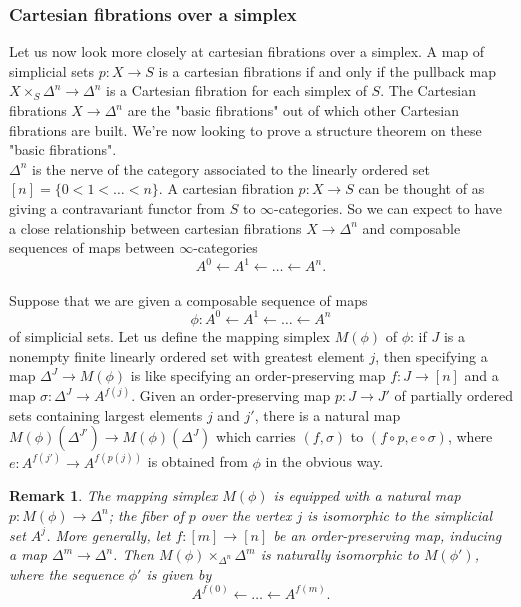 \documentclass[12pt]{amsart}
\newcommand{\8}{\ensuremath{\infty}}
\newtheorem{remark}{Remark}
\begin{document}
\subsubsection{Cartesian fibrations over a simplex}
Let us now look more closely at cartesian fibrations over a simplex. A map of simplicial sets $p:X\rightarrow S$ is a cartesian fibrations if and only if the pullback map $X\times_S \Delta^n \rightarrow \Delta^n$ is a Cartesian fibration for each simplex of $S$. The Cartesian fibrations $X\rightarrow \Delta^n$ are the "basic fibrations" out of which other Cartesian fibrations are built. We're now looking to prove a structure theorem on these "basic fibrations".\\
$\Delta^n$ is the nerve of the category associated to the linearly ordered set $[n] = \{0<1<\dots <n\}.$ A cartesian fibration $p:X\rightarrow S$ can be thought of as giving a contravariant functor from $S$ to $\8$-categories. So we can expect to have a close relationship between cartesian fibrations $X\rightarrow \Delta^n$ and composable sequences of maps between \8-categories \[A^0\leftarrow A^1\leftarrow \dots \leftarrow A^n.\]\\
Suppose that we are given a composable sequence of maps\[\phi:A^0\leftarrow A^1\leftarrow \dots \leftarrow A^n\] of simplicial sets. Let us define the mapping simplex $M(\phi)$ of $\phi$: if $J$ is a nonempty finite linearly ordered set with greatest element $j$, then specifying a map $\Delta^J\rightarrow M(\phi)$ is like specifying an order-preserving map $f:J\rightarrow [n]$ and a map $\sigma:\Delta^J\rightarrow A^{f(j)}$. Given an order-preserving map $p:J\rightarrow J'$ of partially ordered sets containing largest elements $j$ and $j'$, there is a natural map $M(\phi)(\Delta^{J'})\rightarrow M(\phi)(\Delta^J)$ which carries $(f,\sigma)$ to $(f\circ p, e\circ\sigma)$, where $e:A^{f(j')}\rightarrow A^{f(p(j))}$ is obtained from $\phi$ in the obvious way.

\begin{remark}
  The mapping simplex $M(\phi)$ is equipped with a natural map $p:M(\phi)\rightarrow \Delta^n$; the fiber of $p$ over the vertex $j$ is isomorphic to the simplicial set $A^j$. More generally, let $f:[m]\rightarrow [n]$ be an order-preserving map, inducing a map $\Delta^m\rightarrow \Delta^n$. Then $M(\phi)\times_{\Delta^n}\Delta^m$ is naturally isomorphic to $M(\phi')$, where the sequence $\phi'$ is given by \[A^{f(0)}\leftarrow\dots\leftarrow A^{f(m)}.\]
\end{remark}
\end{document}
